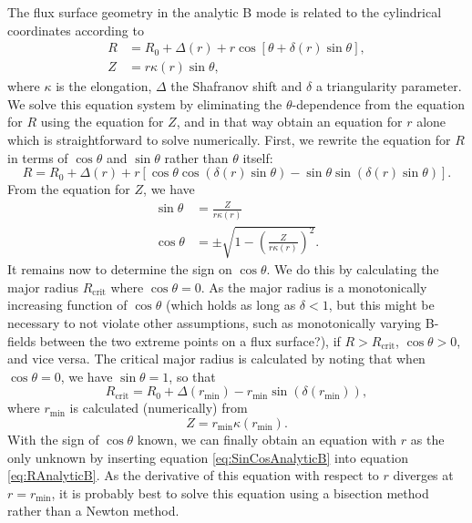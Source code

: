 \documentclass{notes}
\begin{document}
    The flux surface geometry in the analytic B mode is related to the cylindrical coordinates according to
    \begin{align}
R &= R_0 + \Delta(r) + r\cos[\theta +\delta(r) \sin\theta], \nonumber \\
Z &= r \kappa(r) \sin\theta,
\label{eq:analyticB system}
\end{align}
where $\kappa$ is the elongation, $\Delta$ the Shafranov shift and $\delta$ a triangularity parameter. We solve this equation system by eliminating the $\theta$-dependence from the equation for $R$ using the equation for $Z$, and in that way obtain an equation for $r$ alone which is straightforward to solve numerically. First, we rewrite the equation for $R$ in terms of $\cos{\theta}$ and $\sin{\theta}$ rather than $\theta$ itself:
	\begin{equation}
		R = R_0 + \Delta (r) + r[\cos{\theta}\cos{(\delta(r)\sin{\theta})} - \sin{\theta}\sin{(\delta(r)\sin{\theta})}].
		\label{eq:RAnalyticB}
	\end{equation}
	From the equation for $Z$, we have
	\begin{align}
		\sin{\theta} &= \frac{Z}{r\kappa(r)}\nonumber \\
		\cos{\theta} &= \pm \sqrt{1-\left(\frac{Z}{r\kappa(r)}\right)^2}.
		\label{eq:SinCosAnalyticB}
	\end{align}
	It remains now to determine the sign on $\cos{\theta}$. We do this by calculating the major radius $R_\mathrm{crit}$ where $\cos{\theta}=0$. As the major radius is a monotonically increasing function of $\cos{\theta}$ {\color{red}(which holds as long as $\delta < 1$, but this might be necessary to not violate other assumptions, such as monotonically varying B-fields between the two extreme points on a flux surface?)}, if $R>R_\mathrm{crit}$, $\cos{\theta}>0$, and vice versa. The critical major radius is calculated by noting that when $\cos{\theta}=0$, we have $\sin{\theta}=1$, so that
	\begin{equation}
		R_\mathrm{crit} = R_0 + \Delta(r_\mathrm{min}) - r_\mathrm{min}\sin{(\delta(r_\mathrm{min}))},
	\end{equation}
	where $r_\mathrm{min}$ is calculated (numerically) from
	\begin{equation}
		Z = r_\mathrm{min}\kappa(r_\mathrm{min}).
	\end{equation}
	With the sign of $\cos{\theta}$ known, we can finally obtain an equation with $r$ as the only unknown by inserting equation \eqref{eq:SinCosAnalyticB} into equation \eqref{eq:RAnalyticB}. As the derivative of this equation with respect to $r$ diverges at $r=r_\mathrm{min}$, it is probably best to solve this equation using a bisection method rather than a Newton method.
	
\end{document}
